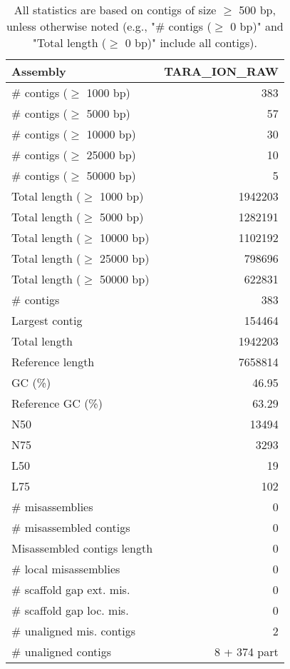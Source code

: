 \documentclass[12pt,a4paper]{article}
\begin{document}
\begin{table}[ht]
\begin{center}
\caption{All statistics are based on contigs of size $\geq$ 500 bp, unless otherwise noted (e.g., "\# contigs ($\geq$ 0 bp)" and "Total length ($\geq$ 0 bp)" include all contigs).}
\begin{tabular}{|l*{1}{|r}|}
\hline
Assembly & TARA\_ION\_RAW \\ \hline
\# contigs ($\geq$ 1000 bp) & 383 \\ \hline
\# contigs ($\geq$ 5000 bp) & 57 \\ \hline
\# contigs ($\geq$ 10000 bp) & 30 \\ \hline
\# contigs ($\geq$ 25000 bp) & 10 \\ \hline
\# contigs ($\geq$ 50000 bp) & 5 \\ \hline
Total length ($\geq$ 1000 bp) & 1942203 \\ \hline
Total length ($\geq$ 5000 bp) & 1282191 \\ \hline
Total length ($\geq$ 10000 bp) & 1102192 \\ \hline
Total length ($\geq$ 25000 bp) & 798696 \\ \hline
Total length ($\geq$ 50000 bp) & 622831 \\ \hline
\# contigs & 383 \\ \hline
Largest contig & 154464 \\ \hline
Total length & 1942203 \\ \hline
Reference length & 7658814 \\ \hline
GC (\%) & 46.95 \\ \hline
Reference GC (\%) & 63.29 \\ \hline
N50 & 13494 \\ \hline
N75 & 3293 \\ \hline
L50 & 19 \\ \hline
L75 & 102 \\ \hline
\# misassemblies & 0 \\ \hline
\# misassembled contigs & 0 \\ \hline
Misassembled contigs length & 0 \\ \hline
\# local misassemblies & 0 \\ \hline
\# scaffold gap ext. mis. & 0 \\ \hline
\# scaffold gap loc. mis. & 0 \\ \hline
\# unaligned mis. contigs & 2 \\ \hline
\# unaligned contigs & 8 + 374 part \\ \hline

\end{tabular}
\end{center}
\end{table}
\end{document}
